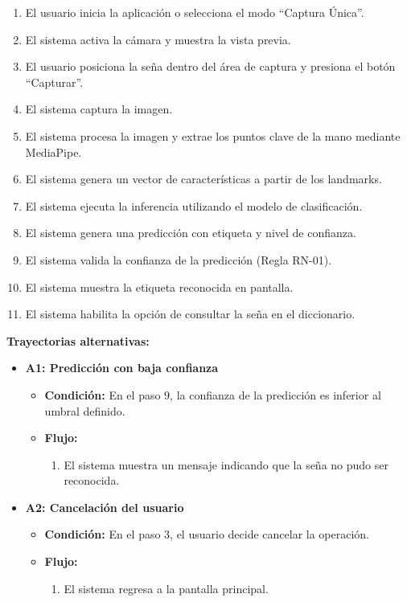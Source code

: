 	\begin{enumerate}
		\item El usuario inicia la aplicación o selecciona el modo ``Captura Única''.
		\item El sistema activa la cámara y muestra la vista previa.
		\item El usuario posiciona la seña dentro del área de captura y presiona el botón ``Capturar''.
		\item El sistema captura la imagen.
		\item El sistema procesa la imagen y extrae los puntos clave de la mano mediante MediaPipe.
		\item El sistema genera un vector de características a partir de los landmarks.
		\item El sistema ejecuta la inferencia utilizando el modelo de clasificación.
		\item El sistema genera una predicción con etiqueta y nivel de confianza.
		\item El sistema valida la confianza de la predicción (Regla RN-01).
		\item El sistema muestra la etiqueta reconocida en pantalla.
		\item El sistema habilita la opción de consultar la seña en el diccionario.
		
	\end{enumerate}
	
	\textbf{Trayectorias alternativas:}
	
	\begin{itemize}
		
		\item \textbf{A1: Predicción con baja confianza}
		\begin{itemize}
			\item \textbf{Condición:} En el paso 9, la confianza de la predicción es inferior al umbral definido.
			\item \textbf{Flujo:}
			\begin{enumerate}
				\item El sistema muestra un mensaje indicando que la seña no pudo ser reconocida.
			\end{enumerate}
		\end{itemize}
		
		\item \textbf{A2: Cancelación del usuario}
		\begin{itemize}
			\item \textbf{Condición:} En el paso 3, el usuario decide cancelar la operación.
			\item \textbf{Flujo:}
			\begin{enumerate}
				\item El sistema regresa a la pantalla principal.
			\end{enumerate}
		\end{itemize}
		
	\end{itemize}
	

